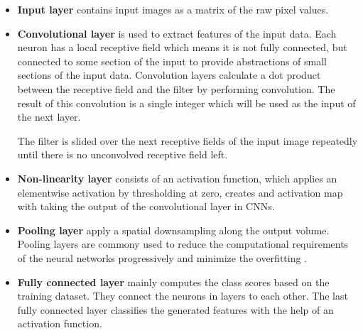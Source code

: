     \begin{itemize}

        \item \textbf{Input layer} contains input images as a matrix of the raw pixel values.

        \item \textbf{Convolutional layer} is used to extract features of the input data.
            Each neuron has a local receptive field which means it is not fully connected, but connected to some section of the input to provide abstractions of small sections of the input data.
            Convolution layers calculate a dot product between the receptive field and the filter by performing convolution.
            The result of this convolution is a single integer which will be used as the input of the next layer.

            The filter is slided over the next receptive fields of the input image repeatedly until there is no unconvolved receptive field left.

        \item \textbf{Non-linearity layer} consists of an activation function, which applies an elementwise activation by thresholding at zero, creates and activation map with taking the output of the convolutional layer in CNNs.

        \item \textbf{Pooling layer} apply a spatial downsampling along the output volume.
            Pooling layers are commony used to reduce the computational requirements of the neural networks progressively and minimize the overfitting \cite{Layersof6online}.

        \item \textbf{Fully connected layer} mainly computes the class scores based on the training dataset.
            They connect the neurons in layers to each other.
            The last fully connected layer classifies the generated features with the help of an activation function.

    \end{itemize}


